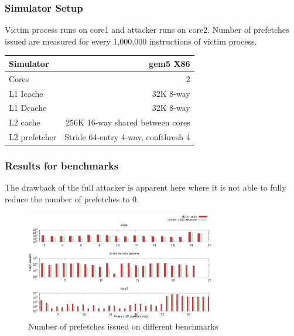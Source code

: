 \documentclass[10pt,usenames,dvipsnames]{beamer}
\begin{document}

\begin{frame}[fragile]
\frametitle{Simulator Setup}

Victim process runs on core1 and attacker runs on core2. Number of prefetches
issued are measured for every 1,000,000 instructions of victim process.\\
\vspace{0.1in}
\begin{tabular}{|l|r|}
    \hline
    Simulator  & gem5 X86\\
    \hline
    Cores  & 2\\
    \hline
    L1 Icache & 32K 8-way\\
    \hline
    L1 Dcache & 32K 8-way\\
    \hline
    L2 cache & 256K 16-way shared between cores\\
    \hline
    L2 prefetcher  & Stride 64-entry 4-way, confthresh 4\\
    \hline
\end{tabular}
\end{frame}


\begin{frame}
\frametitle{Results for benchmarks}
The drawback of the full attacker is apparent here where it is not able to fully reduce
the number of prefetches to 0.

\begin{figure}[ht]
    \centering
    \includegraphics[width=0.75\textwidth]{hwpf_num}
    \caption{Number of prefetches issued on different benchmarks}
\end{figure}
\end{frame}
\end{document}
